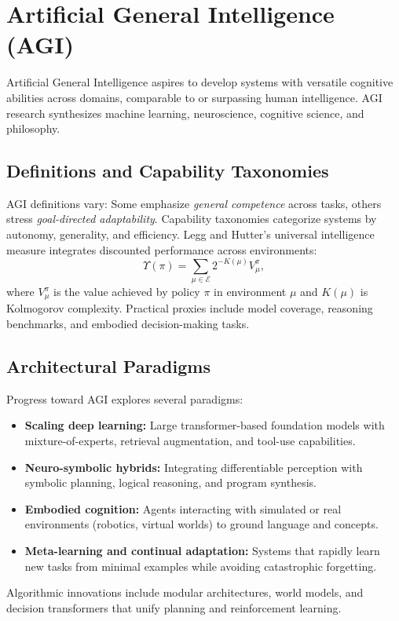 \documentclass{article}
\begin{document}
\section{Artificial General Intelligence (AGI)}
Artificial General Intelligence aspires to develop systems with versatile cognitive abilities across domains, comparable to or surpassing human intelligence. AGI research synthesizes machine learning, neuroscience, cognitive science, and philosophy.

\subsection{Definitions and Capability Taxonomies}
AGI definitions vary: Some emphasize \emph{general competence} across tasks, others stress \emph{goal-directed adaptability}. Capability taxonomies categorize systems by autonomy, generality, and efficiency. Legg and Hutter's universal intelligence measure integrates discounted performance across environments:
\begin{equation}
  \Upsilon(\pi) = \sum_{\mu \in \mathcal{E}} 2^{-K(\mu)} V_\mu^\pi,
\end{equation}
where $V_\mu^\pi$ is the value achieved by policy $\pi$ in environment $\mu$ and $K(\mu)$ is Kolmogorov complexity. Practical proxies include model coverage, reasoning benchmarks, and embodied decision-making tasks.

\subsection{Architectural Paradigms}
Progress toward AGI explores several paradigms:
\begin{itemize}
  \item \textbf{Scaling deep learning:} Large transformer-based foundation models with mixture-of-experts, retrieval augmentation, and tool-use capabilities.
  \item \textbf{Neuro-symbolic hybrids:} Integrating differentiable perception with symbolic planning, logical reasoning, and program synthesis.
  \item \textbf{Embodied cognition:} Agents interacting with simulated or real environments (robotics, virtual worlds) to ground language and concepts.
  \item \textbf{Meta-learning and continual adaptation:} Systems that rapidly learn new tasks from minimal examples while avoiding catastrophic forgetting.
\end{itemize}
Algorithmic innovations include modular architectures, world models, and decision transformers that unify planning and reinforcement learning.
\end{document}
